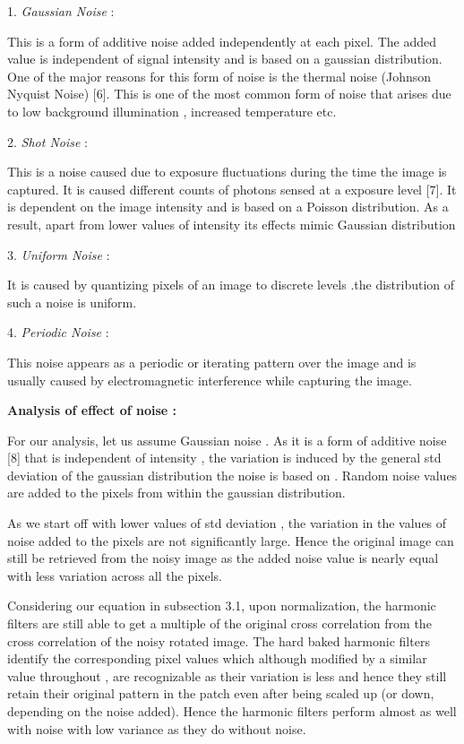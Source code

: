 \documentclass{article}
\begin{document}
1.	\emph{Gaussian Noise} : 

This is a form of additive noise added independently at each pixel. The added value is independent of signal intensity and is based on a gaussian distribution. One of the major reasons for this form of noise is the thermal noise (Johnson Nyquist Noise) [6]. This is one of the most common form of noise that arises due to low background illumination , increased temperature etc.

2.	\emph{Shot Noise} :

This is a noise caused due to exposure fluctuations during the time the image is captured. It is caused different counts of photons sensed at a exposure level [7]. It is dependent on the image intensity and is based on a Poisson distribution. As a result, apart from lower values of intensity its effects mimic Gaussian distribution

3.	\emph{Uniform Noise} : 

It is caused by quantizing pixels of an image to discrete levels .the distribution of such a noise is uniform.

4.	\emph{Periodic Noise} :

This noise appears as a periodic or iterating pattern over the image and is usually caused by electromagnetic interference while capturing the image.

\textbf{Analysis of effect of noise : }

For our analysis, let us assume Gaussian noise . As it is a form of additive noise [8] that is independent of intensity , the variation is induced by the general std deviation of the gaussian distribution the noise is based on . Random noise values are added to the pixels from within the gaussian distribution. 

As we start off with lower values of std deviation , the variation in the values of noise added to the pixels are not significantly large. Hence the original image can still be retrieved from the noisy image as the added noise value is nearly equal with less variation across all the pixels. 

Considering our equation in subsection 3.1, upon normalization, the harmonic filters are still able to get a multiple of the original cross correlation from the cross correlation of the noisy rotated image. The hard baked harmonic filters identify the corresponding pixel values  which although modified by a similar value throughout , are recognizable as their variation is less and hence they still retain their original pattern in the patch even after being scaled up (or down, depending on the noise added). Hence the harmonic filters perform almost as well with noise with low variance as they do without noise.
\end{document}
